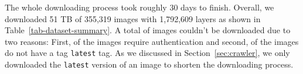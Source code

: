 %
%


The whole downloading process took roughly 30 days to finish.
%
Overall, we downloaded 51 TB of 355,319 images with 1,792,609 layers as shown
in Table~\ref{tab-dataset-summary}.
%
A total of \gap images couldn't be downloaded due to two reasons:
%
First, \gap of the images require authentication and
second, \gap of the images do not have a tag \texttt{latest} tag.
%
As we discussed in Section~\ref{sec:crawler}, we only downloaded the \texttt{latest}
version of an image to shorten the downloading process.







%
%

